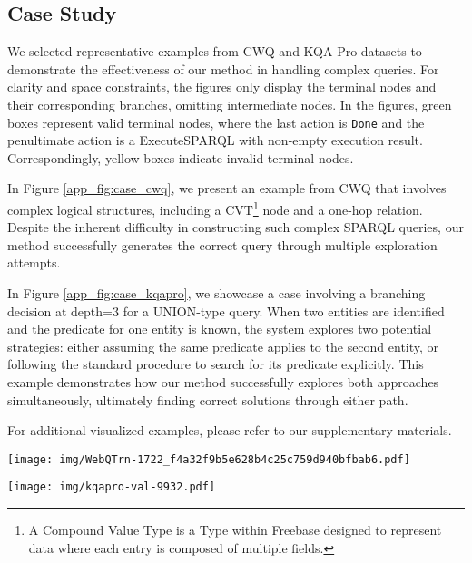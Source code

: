 \subsection{Case Study}
\label{app_sec:case_study}

We selected representative examples from CWQ and KQA Pro datasets to demonstrate the effectiveness of our method in handling complex queries. For clarity and space constraints, the figures only display the terminal nodes and their corresponding branches, omitting intermediate nodes. 
In the figures, green boxes represent valid terminal nodes, where the last action is \texttt{Done} and the penultimate action is a ExecuteSPARQL with non-empty execution result. Correspondingly, yellow boxes indicate invalid terminal nodes.

In Figure \ref{app_fig:case_cwq}, we present an example from CWQ that involves complex logical structures, including a CVT\footnote{A Compound Value Type is a Type within Freebase designed to represent data where each entry is composed of multiple fields.} node and a one-hop relation. Despite the inherent difficulty in constructing such complex SPARQL queries, our method successfully generates the correct query through multiple exploration attempts.

In Figure \ref{app_fig:case_kqapro}, we showcase a case involving a branching decision at depth=3 for a UNION-type query. When two entities are identified and the predicate for one entity is known, the system explores two potential strategies: either assuming the same predicate applies to the second entity, or following the standard procedure to search for its predicate explicitly. This example demonstrates how our method successfully explores both approaches simultaneously, ultimately finding correct solutions through either path.

For additional visualized examples, please refer to our supplementary materials.


\begin{figure*}
  \centering
  \texttt{[image: img/WebQTrn-1722\_f4a32f9b5e628b4c25c759d940bfbab6.pdf]}
  \caption{Example from CWQ.}
  \label{app_fig:case_cwq}
\end{figure*}

\begin{figure*}
  \centering
  \texttt{[image: img/kqapro-val-9932.pdf]}
  \caption{Example from KQA Pro.}
  \label{app_fig:case_kqapro}
\end{figure*}

